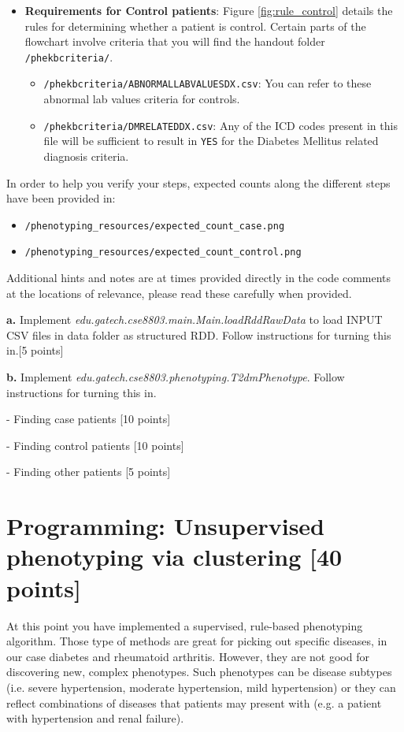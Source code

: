 \documentclass[12pt]{article}
\begin{document}
\begin{itemize}
\item \textbf{Requirements for Control patients}: Figure \ref{fig:rule_control} details the rules for determining whether a patient is control. Certain parts of the flowchart involve criteria that you will find the handout folder \texttt{/phekb\textunderscore criteria/}.
\begin{itemize}
\item \texttt{/phekb\textunderscore criteria/ABNORMAL\textunderscore LAB\textunderscore VALUES\textunderscore DX.csv}: You can refer to these abnormal lab values criteria for controls. 
\item \texttt{/phekb\textunderscore criteria/DM\textunderscore RELATED\textunderscore DX.csv}: Any of the ICD codes present in this file will be sufficient to result in \texttt{YES} for the Diabetes Mellitus related diagnosis criteria.
\end{itemize}
\end{itemize}
In order to help you verify your steps, expected counts along the different steps have been provided in:
\begin{itemize}
\item \texttt{/phenotyping\_resources/expected\_count\_case.png}
\item \texttt{/phenotyping\_resources/expected\_count\_control.png}
\end{itemize}
 Additional hints and notes are at times provided directly in the code comments at the locations of relevance, please read these carefully when provided.

\textbf{a.} Implement \textit{edu.gatech.cse8803.main.Main.loadRddRawData} to load INPUT CSV files in data folder as structured RDD. Follow instructions for turning this in.[5 points]
\newline

\textbf{b.}  Implement \textit{edu.gatech.cse8803.phenotyping.T2dmPhenotype}. Follow instructions for turning this in. 

- Finding case patients [10 points]

- Finding control patients [10 points]

- Finding other patients [5 points]






\section{Programming: Unsupervised phenotyping via clustering [40 points]}
At this point you have implemented a supervised, rule-based phenotyping algorithm. Those type of methods are great for picking out specific diseases, in our case diabetes and rheumatoid arthritis. However, they are not good for discovering new, complex phenotypes. Such phenotypes can be disease subtypes (i.e. severe hypertension, moderate hypertension, mild hypertension) or they can reflect combinations of diseases that patients may present with (e.g. a patient with hypertension and renal failure).
\end{document}
